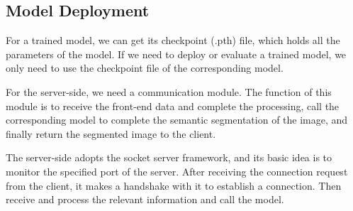 \subsection{Model Deployment}


For a trained model, we can get its checkpoint (.pth) file, which holds all the parameters of the model. If we need to deploy or evaluate a trained model, we only need to use the checkpoint file of the corresponding model.


For the server-side, we need a communication module. The function of this module is to receive the front-end data and complete the processing, call the corresponding model to complete the semantic segmentation of the image, and finally return the segmented image to the client.


The server-side adopts the socket server framework, and its basic idea is to monitor the specified port of the server. After receiving the connection request from the client, it makes a handshake with it to establish a connection. Then receive and process the relevant information and call the model.




\clearpage